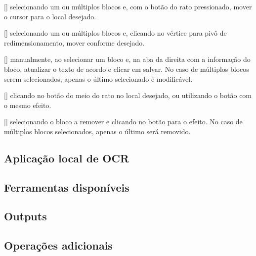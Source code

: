 

[\normalsize] selecionando um ou múltiplos blocos e, com o botão do rato pressionado, mover o cursor para o local desejado.



[\normalsize] selecionando um ou múltiplos blocos e, clicando no vértice para pivô de redimensionamento, mover conforme desejado.


[\normalsize] manualmente, ao selecionar um bloco e, na aba da direita com a informação do bloco, atualizar o texto de acordo e clicar em salvar. No caso de múltiplos blocos serem selecionados, apenas o último selecionado é modificável.


[\normalsize] clicando no botão do meio do rato no local desejado, ou utilizando o botão com o mesmo efeito.



[\normalsize] selecionando o bloco a remover e clicando no botão para o efeito. No caso de múltiplos blocos selecionados, apenas o último será removido.




\subsection{Aplicação local de OCR}

\subsection{Ferramentas disponíveis}

\subsection{Outputs}

\subsection{Operações adicionais}

